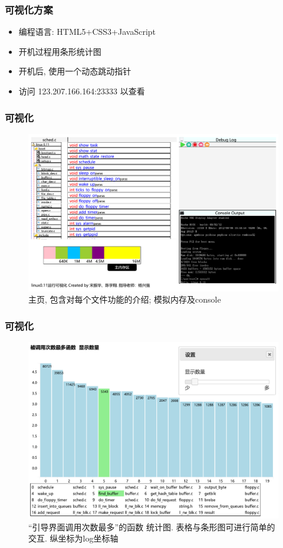 \documentclass[14pt,UTF-8]{beamer}
\begin{document}
\begin{frame}
\frametitle{可视化方案}
\begin{itemize}
	\item 编程语言: HTML5+CSS3+JavaScript
	\item 开机过程用条形统计图
	\item 开机后, 使用一个动态跳动指针
	\item 访问 123.207.166.164:23333 以查看
\end{itemize}

\end{frame}

\begin{frame}
\frametitle{可视化}
\begin{figure}[htbp]
	\centering
	\includegraphics[width=\textwidth,natwidth=773 ,natheight=487]{img/index.html.pdf}
	\caption[]{主页, 包含对每个文件功能的介绍; 模拟内存及console}
	\label{fig:indexgraph}
\end{figure}
\end{frame}

\begin{frame}
\frametitle{可视化}
\begin{figure}[htbp]
	\centering
	\includegraphics[width=\textwidth,natwidth=594 ,natheight=419]{img/calledMaxFunc.pdf}
	\caption[]{“引导界面调用次数最多”的函数 统计图. 表格与条形图可进行简单的交互. 纵坐标为log坐标轴}
	\label{fig:calledMaxFuncgraph}
\end{figure}
\end{frame}
\end{document}
